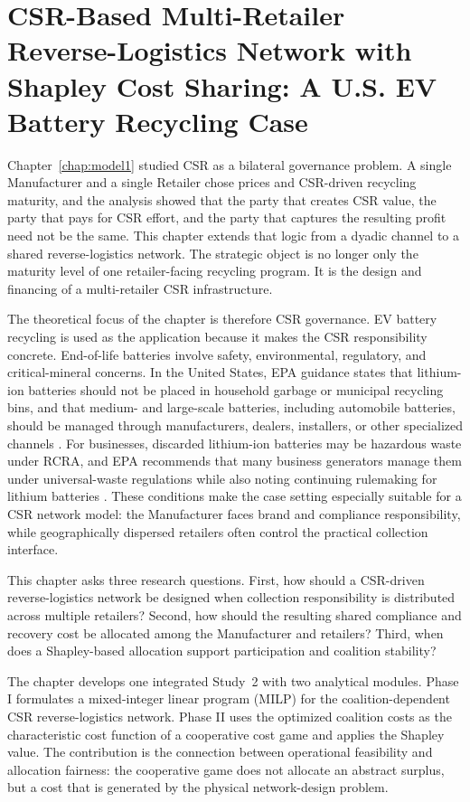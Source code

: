 \chapter{CSR-Based Multi-Retailer Reverse-Logistics Network with Shapley Cost Sharing: A U.S. EV Battery Recycling Case}
\label{chap:model2}

Chapter~\ref{chap:model1} studied CSR as a bilateral governance problem. A single Manufacturer and a single Retailer chose prices and CSR-driven recycling maturity, and the analysis showed that the party that creates CSR value, the party that pays for CSR effort, and the party that captures the resulting profit need not be the same. This chapter extends that logic from a dyadic channel to a shared reverse-logistics network. The strategic object is no longer only the maturity level of one retailer-facing recycling program. It is the design and financing of a multi-retailer CSR infrastructure.

The theoretical focus of the chapter is therefore CSR governance. EV battery recycling is used as the application because it makes the CSR responsibility concrete. End-of-life batteries involve safety, environmental, regulatory, and critical-mineral concerns. In the United States, EPA guidance states that lithium-ion batteries should not be placed in household garbage or municipal recycling bins, and that medium- and large-scale batteries, including automobile batteries, should be managed through manufacturers, dealers, installers, or other specialized channels \cite{EPA2026UsedLithiumIon}. For businesses, discarded lithium-ion batteries may be hazardous waste under RCRA, and EPA recommends that many business generators manage them under universal-waste regulations while also noting continuing rulemaking for lithium batteries \cite{EPA2026UniversalWaste}. These conditions make the case setting especially suitable for a CSR network model: the Manufacturer faces brand and compliance responsibility, while geographically dispersed retailers often control the practical collection interface.

This chapter asks three research questions. First, how should a CSR-driven reverse-logistics network be designed when collection responsibility is distributed across multiple retailers? Second, how should the resulting shared compliance and recovery cost be allocated among the Manufacturer and retailers? Third, when does a Shapley-based allocation support participation and coalition stability?

The chapter develops one integrated Study~2 with two analytical modules. Phase I formulates a mixed-integer linear program (MILP) for the coalition-dependent CSR reverse-logistics network. Phase II uses the optimized coalition costs as the characteristic cost function of a cooperative cost game and applies the Shapley value. The contribution is the connection between operational feasibility and allocation fairness: the cooperative game does not allocate an abstract surplus, but a cost that is generated by the physical network-design problem.


